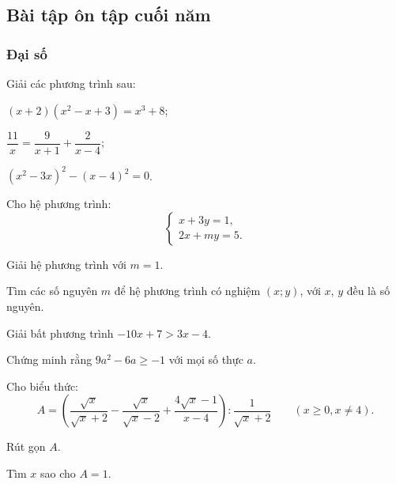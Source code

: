 \begin{practice}
    \subsection{Bài tập ôn tập cuối năm}
    \renewcommand{\questionprefix}{}

    \subsubsection*{Đại số}

    \begin{questions}[series=SBT]
        \item Giải các phương trình sau:
        \begin{questions}
            \item $(x+2)(x^2-x+3)=x^3+8$;
            \answerline
            \item $\dfrac{11}{x}=\dfrac{9}{x+1}+\dfrac{2}{x-4}$;
            \answerline
            \answerline
            \item $(x^2-3x)^2-(x-4)^2=0$.
            \answerline
        \end{questions}

        \item Cho hệ phương trình:
        \[
            \begin{cases}
                x+3y=1,\\
                2x+my=5.
            \end{cases}
        \]
        \begin{questions}
            \item Giải hệ phương trình với $m=1$.
            \answerline
            \item Tìm các số nguyên $m$ để hệ phương trình có nghiệm $(x;y)$, với $x$, $y$ đều là số nguyên.
            \answerline
            \answerline
        \end{questions}

        \item
        \begin{questions}
            \item Giải bất phương trình $-10x+7>3x-4$.
            \answerline
            \item Chứng minh rằng $9a^2-6a\ge -1$ với mọi số thực $a$.
            \answerline
            \answerline
        \end{questions}

        \item Cho biểu thức:
        \[
            A=\left(\dfrac{\sqrt{x}}{\sqrt{x}+2}-\dfrac{\sqrt{x}}{\sqrt{x}-2}+\dfrac{4\sqrt{x}-1}{x-4}\right):\dfrac{1}{\sqrt{x}+2}\qquad (x\ge0,x\ne4).
        \]
        \begin{questions}
            \item Rút gọn $A$.
            \answerline
            \answerline
            \item Tìm $x$ sao cho $A=1$.
            \answerline
        \end{questions}


\end{questions}
\end{practice}
